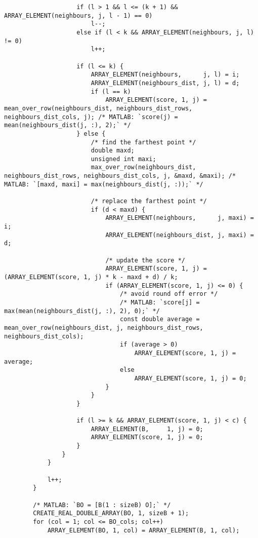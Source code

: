 \begin{lstlisting}
                    if (l > 1 && l <= (k + 1) && ARRAY_ELEMENT(neighbours, j, l - 1) == 0)
                        l--;
                    else if (l < k && ARRAY_ELEMENT(neighbours, j, l) != 0)
                        l++;

                    if (l <= k) {
                        ARRAY_ELEMENT(neighbours,      j, l) = i;
                        ARRAY_ELEMENT(neighbours_dist, j, l) = d;
                        if (l == k)
                            ARRAY_ELEMENT(score, 1, j) = mean_over_row(neighbours_dist, neighbours_dist_rows, neighbours_dist_cols, j); /* MATLAB: `score(j) = mean(neighbours_dist(j, :), 2);` */
                    } else {
                        /* find the farthest point */
                        double maxd;
                        unsigned int maxi;
                        max_over_row(neighbours_dist, neighbours_dist_rows, neighbours_dist_cols, j, &maxd, &maxi); /* MATLAB: `[maxd, maxi] = max(neighbours_dist(j, :));` */

                        /* replace the farthest point */
                        if (d < maxd) {
                            ARRAY_ELEMENT(neighbours,      j, maxi) = i;
                            ARRAY_ELEMENT(neighbours_dist, j, maxi) = d;

                            /* update the score */
                            ARRAY_ELEMENT(score, 1, j) = (ARRAY_ELEMENT(score, 1, j) * k - maxd + d) / k;
                            if (ARRAY_ELEMENT(score, 1, j) <= 0) {
                                /* avoid round off error */
                                /* MATLAB: `score[j] = max(mean(neighbours_dist(j, :), 2), 0);` */
                                const double average = mean_over_row(neighbours_dist, j, neighbours_dist_rows, neighbours_dist_cols);
                                if (average > 0)
                                    ARRAY_ELEMENT(score, 1, j) = average;
                                else
                                    ARRAY_ELEMENT(score, 1, j) = 0;
                            }
                        }
                    }

                    if (l >= k && ARRAY_ELEMENT(score, 1, j) < c) {
                        ARRAY_ELEMENT(B,     1, j) = 0;
                        ARRAY_ELEMENT(score, 1, j) = 0;
                    }
                }
            }

            l++;
        }

        /* MATLAB: `BO = [B(1 : sizeB) O];` */
        CREATE_REAL_DOUBLE_ARRAY(BO, 1, sizeB + 1);
        for (col = 1; col <= BO_cols; col++)
            ARRAY_ELEMENT(BO, 1, col) = ARRAY_ELEMENT(B, 1, col);


\end{lstlisting}
